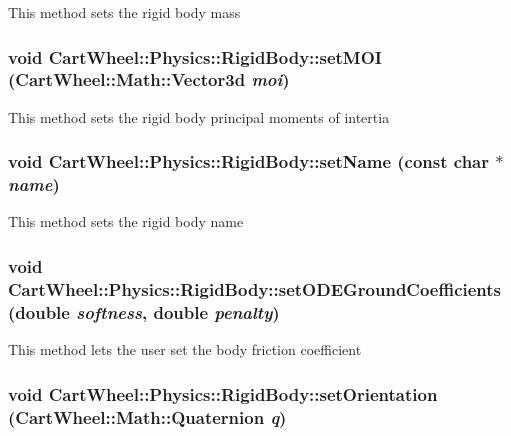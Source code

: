 \label{classCartWheel_1_1Physics_1_1RigidBody_ac3cefd3c64d69b3fd4ed991f93639e1c}
This method sets the rigid body mass \hypertarget{classCartWheel_1_1Physics_1_1RigidBody_a80cf4479818fd2cecf88b30ea4602e7f}{
\subsubsection[{setMOI}]{\setlength{\rightskip}{0pt plus 5cm}void CartWheel::Physics::RigidBody::setMOI ({\bf CartWheel::Math::Vector3d} {\em moi})}}
\label{classCartWheel_1_1Physics_1_1RigidBody_a80cf4479818fd2cecf88b30ea4602e7f}
This method sets the rigid body principal moments of intertia \hypertarget{classCartWheel_1_1Physics_1_1RigidBody_a25491da90c53853447ea6e0b098fba3a}{
\subsubsection[{setName}]{\setlength{\rightskip}{0pt plus 5cm}void CartWheel::Physics::RigidBody::setName (const char $\ast$ {\em name})}}
\label{classCartWheel_1_1Physics_1_1RigidBody_a25491da90c53853447ea6e0b098fba3a}
This method sets the rigid body name \hypertarget{classCartWheel_1_1Physics_1_1RigidBody_a9cb0889861eb744225cde11a3e972c6b}{
\subsubsection[{setODEGroundCoefficients}]{\setlength{\rightskip}{0pt plus 5cm}void CartWheel::Physics::RigidBody::setODEGroundCoefficients (double {\em softness}, \/  double {\em penalty})}}
\label{classCartWheel_1_1Physics_1_1RigidBody_a9cb0889861eb744225cde11a3e972c6b}
This method lets the user set the body friction coefficient \hypertarget{classCartWheel_1_1Physics_1_1RigidBody_a1d1a3a4e94866d7fde89ab81b117125b}{
\subsubsection[{setOrientation}]{\setlength{\rightskip}{0pt plus 5cm}void CartWheel::Physics::RigidBody::setOrientation ({\bf CartWheel::Math::Quaternion} {\em q})}}
